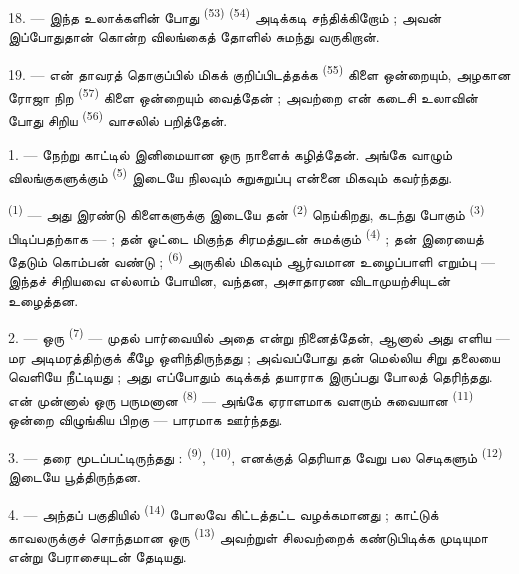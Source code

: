 18. --- இந்த உலாக்களின் போது 
\textsuperscript{(53)} 
\textsuperscript{(54)} அடிக்கடி சந்திக்கிறோம் ; அவன் இப்போதுதான்
கொன்ற விலங்கைத் தோளில் சுமந்து வருகிறான்.

19. --- என் தாவரத் தொகுப்பில் மிகக் குறிப்பிடத்தக்க 
\textsuperscript{(55)} கிளை ஒன்றையும், அழகான ரோஜா நிற 
\textsuperscript{(57)} கிளை ஒன்றையும் வைத்தேன் ; அவற்றை என் கடைசி
உலாவின் போது சிறிய  \textsuperscript{(56)} வாசலில்
பறித்தேன்.

\VUsaut{3.0mm}
\VUsaut{3.0mm}

\VUsaut{3.0mm}

1. --- நேற்று காட்டில் இனிமையான ஒரு நாளைக் கழித்தேன். அங்கே வாழும்
விலங்குகளுக்கும்  \textsuperscript{(5)} இடையே
நிலவும் சுறுசுறுப்பு என்னை மிகவும் கவர்ந்தது.

 \textsuperscript{(1)} — அது இரண்டு கிளைகளுக்கு இடையே
தன்  \textsuperscript{(2)} நெய்கிறது, கடந்து போகும்
 \textsuperscript{(3)} பிடிப்பதற்காக — ; தன் ஓட்டை மிகுந்த சிரமத்துடன்
சுமக்கும்  \textsuperscript{(4)} ; தன் இரையைத் தேடும்
கொம்பன் வண்டு ;  \textsuperscript{(6)}
அருகில் மிகவும் ஆர்வமான உழைப்பாளி எறும்பு — இந்தச் சிறியவை
எல்லாம் போயின, வந்தன, அசாதாரண விடாமுயற்சியுடன் உழைத்தன.

2. --- ஒரு  \textsuperscript{(7)} — முதல் பார்வையில் அதை
 என்று நினைத்தேன், ஆனால் அது எளிய  — மர அடிமரத்திற்குக் கீழே ஒளிந்திருந்தது ; அவ்வப்போது தன்
மெல்லிய சிறு தலையை வெளியே நீட்டியது ; அது எப்போதும் கடிக்கத் தயாராக
இருப்பது போலத் தெரிந்தது. என் முன்னால் ஒரு பருமனான 
\textsuperscript{(8)} — அங்கே ஏராளமாக வளரும் சுவையான  \textsuperscript{(11)} ஒன்றை விழுங்கிய பிறகு — பாரமாக
ஊர்ந்தது.

3. --- தரை  மூடப்பட்டிருந்தது :
 \textsuperscript{(9)},
 \textsuperscript{(10)}, எனக்குத்
தெரியாத வேறு பல செடிகளும் 
\textsuperscript{(12)} இடையே பூத்திருந்தன.

4. --- அந்தப் பகுதியில்  
\textsuperscript{(14)} போலவே கிட்டத்தட்ட வழக்கமானது ; காட்டுக்
காவலருக்குச் சொந்தமான ஒரு 
\textsuperscript{(13)} அவற்றுள் சிலவற்றைக் கண்டுபிடிக்க முடியுமா
என்று பேராசையுடன் தேடியது.


